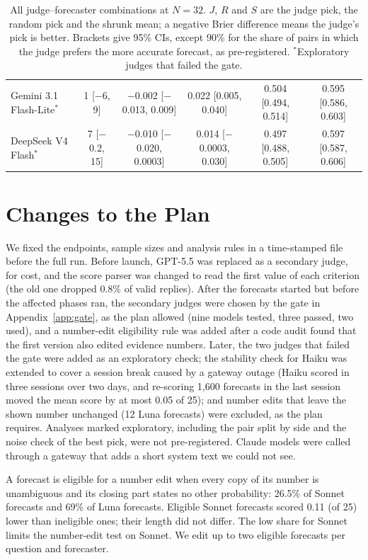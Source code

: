 \documentclass[letterpaper]{article} %
\begin{document}
\begin{table}[t]
\begin{tabular}{@{}lccccc@{}}
Gemini 3.1 Flash-Lite$^*$ & 1 [$-$6, 9] & $-$0.002 [$-$0.013, 0.009] & 0.022 [0.005, 0.040] & 0.504 [0.494, 0.514] & 0.595 [0.586, 0.603] \\
DeepSeek V4 Flash$^*$ & 7 [$-$0.2, 15] & $-$0.010 [$-$0.020, 0.0003] & 0.014 [$-$0.0003, 0.030] & 0.497 [0.488, 0.505] & 0.597 [0.587, 0.606] \\
\bottomrule
\end{tabular}
\caption{All judge--forecaster combinations at $N = 32$. $J$, $R$ and $S$ are the judge pick, the random pick and the shrunk mean; a negative Brier difference means the judge's pick is better. Brackets give 95\% CIs, except 90\% for the share of pairs in which the judge prefers the more accurate forecast, as pre-registered. $^*$Exploratory judges that failed the gate.}
\label{tab:cells}
\end{table}

\section{Changes to the Plan}\label{app:changes}
We fixed the endpoints, sample sizes and analysis rules in a time-stamped file before the full run. Before launch, GPT-5.5 was replaced as a secondary judge, for cost, and the score parser was changed to read the first value of each criterion (the old one dropped 0.8\% of valid replies). After the forecasts started but before the affected phases ran, the secondary judges were chosen by the gate in Appendix~\ref{app:gate}, as the plan allowed (nine models tested, three passed, two used), and a number-edit eligibility rule was added after a code audit found that the first version also edited evidence numbers. Later, the two judges that failed the gate were added as an exploratory check; the stability check for Haiku was extended to cover a session break caused by a gateway outage (Haiku scored in three sessions over two days, and re-scoring 1,600 forecasts in the last session moved the mean score by at most 0.05 of 25); and number edits that leave the shown number unchanged (12 Luna forecasts) were excluded, as the plan requires. Analyses marked exploratory, including the pair split by side and the noise check of the best pick, were not pre-registered. Claude models were called through a gateway that adds a short system text we could not see.

A forecast is eligible for a number edit when every copy of its number is unambiguous and its closing part states no other probability: 26.5\% of Sonnet forecasts and 69\% of Luna forecasts. Eligible Sonnet forecasts scored 0.11 (of 25) lower than ineligible ones; their length did not differ. The low share for Sonnet limits the number-edit test on Sonnet. We edit up to two eligible forecasts per question and forecaster.
\end{document}
